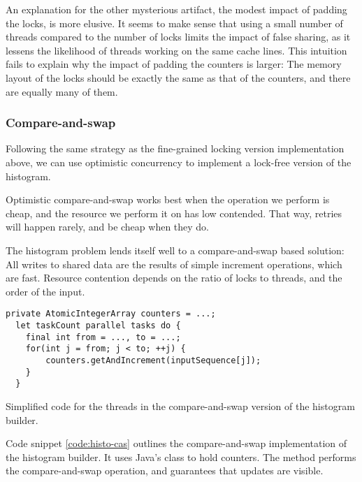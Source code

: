 An explanation for the other mysterious artifact, the modest impact of padding
the locks, is more elusive. It seems to make sense that using a small number of
threads compared to the number of locks limits the impact of false sharing, as
it lessens the likelihood of threads working on the same cache lines. This
intuition fails to explain why the impact of padding the counters is larger: The
memory layout of the locks should be exactly the same as that of the counters,
and there are equally many of them.




\subsubsection{Compare-and-swap}
Following the same strategy as the fine-grained locking version implementation
above, we can use optimistic concurrency to implement a lock-free version of
the histogram.

Optimistic compare-and-swap works best when the operation we perform is cheap,
and the resource we perform it on has low contended. That way, retries will
happen rarely, and be cheap when they do.

The histogram problem lends itself well to a compare-and-swap based solution:
All writes to shared data are the results of simple increment operations, which
are fast. Resource contention depends on the ratio of locks to threads, and the
order of the input.

\begin{code}
\begin{Verbatim}[frame=single]
  private AtomicIntegerArray counters = ...;
  let taskCount parallel tasks do {
    final int from = ..., to = ...;
    for(int j = from; j < to; ++j) {
        counters.getAndIncrement(inputSequence[j]);
    }
  }
\end{Verbatim}
	\caption{Simplified code for the threads in the compare-and-swap 
	version of the histogram builder.}
	\label{code:histo-cas}
\end{code}

Code snippet \ref{code:histo-cas} outlines the compare-and-swap implementation
of the histogram builder. It uses Java's  class to
hold counters. The  method performs the compare-and-swap
operation, and guarantees that updates are visible.

